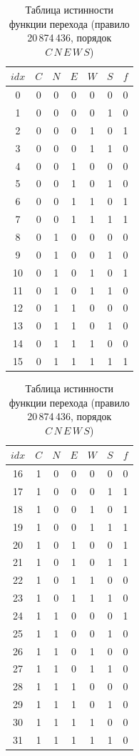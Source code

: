 \documentclass[a4paper,14pt]{extarticle}
\begin{document}
\begin{table}[H]
	\centering
	\caption{Таблица истинности функции перехода (правило 20\,874\,436, порядок $C\,N\,E\,W\,S$)}
	\label{tab:truth}
	\small
	\begin{tabular}{|c|ccccc|c|}
		\hline
		$idx$ & $C$ & $N$ & $E$ & $W$ & $S$ & $f$ \\
		\hline
		0 & 0 & 0 & 0 & 0 & 0 & 0 \\
		1 & 0 & 0 & 0 & 0 & 1 & 0 \\
		2 & 0 & 0 & 0 & 1 & 0 & 1 \\
		3 & 0 & 0 & 0 & 1 & 1 & 0 \\
		4 & 0 & 0 & 1 & 0 & 0 & 0 \\
		5 & 0 & 0 & 1 & 0 & 1 & 0 \\
		6 & 0 & 0 & 1 & 1 & 0 & 1 \\
		7 & 0 & 0 & 1 & 1 & 1 & 1 \\
		8 & 0 & 1 & 0 & 0 & 0 & 0 \\
		9 & 0 & 1 & 0 & 0 & 1 & 0 \\
		10 & 0 & 1 & 0 & 1 & 0 & 1 \\
		11 & 0 & 1 & 0 & 1 & 1 & 0 \\
		12 & 0 & 1 & 1 & 0 & 0 & 0 \\
		13 & 0 & 1 & 1 & 0 & 1 & 0 \\
		14 & 0 & 1 & 1 & 1 & 0 & 0 \\
		15 & 0 & 1 & 1 & 1 & 1 & 1 \\
		\hline
	\end{tabular}
	\hspace{1cm}
	\begin{tabular}{|c|ccccc|c|}
		\hline
		$idx$ & $C$ & $N$ & $E$ & $W$ & $S$ & $f$ \\
		\hline
		16 & 1 & 0 & 0 & 0 & 0 & 0 \\
		17 & 1 & 0 & 0 & 0 & 1 & 1 \\
		18 & 1 & 0 & 0 & 1 & 0 & 1 \\
		19 & 1 & 0 & 0 & 1 & 1 & 1 \\
		20 & 1 & 0 & 1 & 0 & 0 & 1 \\
		21 & 1 & 0 & 1 & 0 & 1 & 1 \\
		22 & 1 & 0 & 1 & 1 & 0 & 0 \\
		23 & 1 & 0 & 1 & 1 & 1 & 0 \\
		24 & 1 & 1 & 0 & 0 & 0 & 1 \\
		25 & 1 & 1 & 0 & 0 & 1 & 0 \\
		26 & 1 & 1 & 0 & 1 & 0 & 0 \\
		27 & 1 & 1 & 0 & 1 & 1 & 0 \\
		28 & 1 & 1 & 1 & 0 & 0 & 0 \\
		29 & 1 & 1 & 1 & 0 & 1 & 0 \\
		30 & 1 & 1 & 1 & 1 & 0 & 0 \\
		31 & 1 & 1 & 1 & 1 & 1 & 0 \\
		\hline
	\end{tabular}
\end{table}
\end{document}
